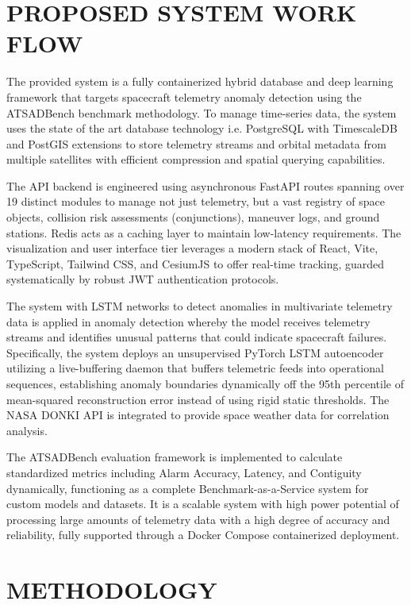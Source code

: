 \documentclass[conference]{IEEEtran}
\begin{document}
\section{PROPOSED SYSTEM WORK FLOW}

The provided system is a fully containerized hybrid database and deep learning framework that targets spacecraft telemetry anomaly detection using the ATSADBench benchmark methodology. To manage time-series data, the system uses the state of the art database technology i.e. PostgreSQL with TimescaleDB and PostGIS extensions to store telemetry streams and orbital metadata from multiple satellites with efficient compression and spatial querying capabilities.

The API backend is engineered using asynchronous FastAPI routes spanning over 19 distinct modules to manage not just telemetry, but a vast registry of space objects, collision risk assessments (conjunctions), maneuver logs, and ground stations. Redis acts as a caching layer to maintain low-latency requirements. The visualization and user interface tier leverages a modern stack of React, Vite, TypeScript, Tailwind CSS, and CesiumJS to offer real-time tracking, guarded systematically by robust JWT authentication protocols.

The system with LSTM networks to detect anomalies in multivariate telemetry data is applied in anomaly detection whereby the model receives telemetry streams and identifies unusual patterns that could indicate spacecraft failures. Specifically, the system deploys an unsupervised PyTorch LSTM autoencoder utilizing a live-buffering daemon that buffers telemetric feeds into operational sequences, establishing anomaly boundaries dynamically off the 95th percentile of mean-squared reconstruction error instead of using rigid static thresholds. The NASA DONKI API is integrated to provide space weather data for correlation analysis.

The ATSADBench evaluation framework is implemented to calculate standardized metrics including Alarm Accuracy, Latency, and Contiguity dynamically, functioning as a complete Benchmark-as-a-Service system for custom models and datasets. It is a scalable system with high power potential of processing large amounts of telemetry data with a high degree of accuracy and reliability, fully supported through a Docker Compose containerized deployment.



\section{METHODOLOGY}
\end{document}

